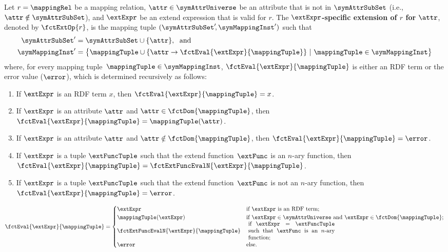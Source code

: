 \begin{definition}
	\label{def:extend_operator}
	Let $r = \mappingRel$ be a mapping relation, $\attr \in \symAttrUniverse$ be
	an attribute that is not in $\symAttrSubSet$ (i.e., $\attr \notin \symAttrSubSet$),
	and $\extExpr$ be an extend expression that is valid for $r$.
	The \textbf{$\extExpr$-specific extension of $r$ for $\attr$}, 
    denoted by $\fctExtOp{r}$,
	is the mapping tuple
	$(\symAttrSubSet'\!,\symMappingInst')$ such that
	\begin{align*}
		\symAttrSubSet'  & = \symAttrSubSet \cup \{ \attr \}, \; \text{ and }                                            \\
		\symMappingInst' & = \bigl\{\mappingTuple \cup \{\attr \rightarrow \fctEval{\extExpr}{\mappingTuple}\} \ | \
		\mappingTuple \in \symMappingInst \bigr\}
	\end{align*}
	where, for every mapping tuple~$\mappingTuple \in \symMappingInst$, $\fctEval{\extExpr}{\mappingTuple}$ is either an RDF term or the
	error value ($\error$), which is determined recursively as follows:

	\begin{enumerate}
		\item If $\extExpr$ is an RDF term $x$, then $\fctEval{\extExpr}{\mappingTuple} = x$.
		\item If $\extExpr$ is an attribute $\attr$ and $\attr \in \fctDom{\mappingTuple}$, then $\fctEval{\extExpr}{\mappingTuple} = \mappingTuple(\attr)$.
		\item If $\extExpr$ is an attribute $\attr$ and $\attr \notin \fctDom{\mappingTuple}$, then $\fctEval{\extExpr}{\mappingTuple} = \error$.
		\item If $\extExpr$ is a tuple $\extFuncTuple$ such that the extend function~$\extFunc$ is an $n$-ary function, then
		      $\fctEval{\extExpr}{\mappingTuple} =  \fctExtFuncEvalN{\extExpr}{\mappingTuple}$.
		\item If $\extExpr$ is a tuple $\extFuncTuple$ such that the extend function~$\extFunc$ is not an $n$-ary function, then
		      $\fctEval{\extExpr}{\mappingTuple} =  \error$.
	\end{enumerate}

	\begin{equation*}
		\fctEval{\extExpr}{\mappingTuple} =
		\begin{cases}
			\extExpr                                  & \text{if $\extExpr$ is an RDF term;}                                                        \\
			\mappingTuple(\extExpr)                   & \text{if $\extExpr \in \symAttrUniverse$ and $\extExpr \in \fctDom{\mappingTuple}$;}        \\
			\fctExtFuncEvalN{\extExpr}{\mappingTuple} & \ \parbox{15em}{if $\extExpr = \extFuncTuple$ such that $\extFunc$ is an $n$-ary function;} \\
			\error                                    & \text{else.}
		\end{cases}
	\end{equation*}


\end{definition}



